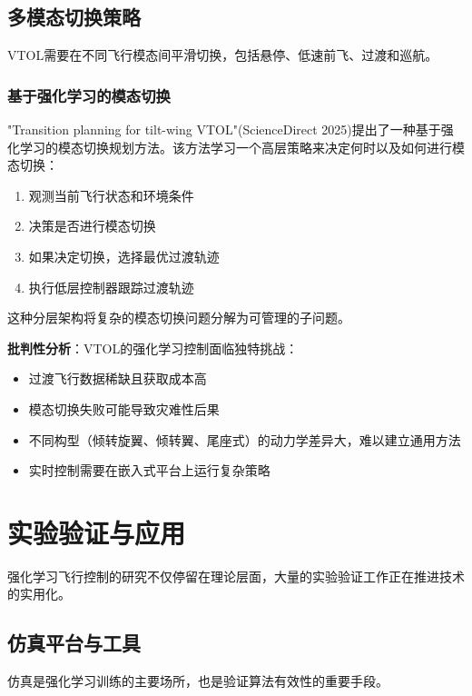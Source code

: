 \documentclass[12pt,a4paper]{ctexart}
\begin{document}
\subsection{多模态切换策略}

VTOL需要在不同飞行模态间平滑切换，包括悬停、低速前飞、过渡和巡航。

\subsubsection{基于强化学习的模态切换}

"Transition planning for tilt-wing VTOL"(ScienceDirect 2025)提出了一种基于强化学习的模态切换规划方法。该方法学习一个高层策略来决定何时以及如何进行模态切换：

\begin{enumerate}
    \item 观测当前飞行状态和环境条件
    \item 决策是否进行模态切换
    \item 如果决定切换，选择最优过渡轨迹
    \item 执行低层控制器跟踪过渡轨迹
\end{enumerate}

这种分层架构将复杂的模态切换问题分解为可管理的子问题。

\textbf{批判性分析}：VTOL的强化学习控制面临独特挑战：
\begin{itemize}
    \item 过渡飞行数据稀缺且获取成本高
    \item 模态切换失败可能导致灾难性后果
    \item 不同构型（倾转旋翼、倾转翼、尾座式）的动力学差异大，难以建立通用方法
    \item 实时控制需要在嵌入式平台上运行复杂策略
\end{itemize}

\section{实验验证与应用}\label{sec:experiment}

强化学习飞行控制的研究不仅停留在理论层面，大量的实验验证工作正在推进技术的实用化。

\subsection{仿真平台与工具}

仿真是强化学习训练的主要场所，也是验证算法有效性的重要手段。
\end{document}
